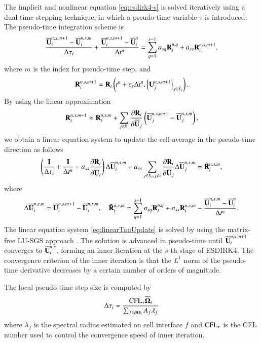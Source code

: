The implicit and nonlinear equation \eqref{eq:esdirk4-s} is solved iteratively using a dual-time stepping technique, in which a pseudo-time variable $\tau$ is introduced. The pseudo-time integration scheme is %
\begin{equation}
    \dfrac{\overline{\mathbf{U}}^{n,s,m+1}_i-\overline{\mathbf{U}}^{n,s,m}_i}{\mathrm\Delta \tau_i} + \dfrac{\overline{\mathbf{U}}^{n,s,m+1}_i - \overline{\mathbf{U}}^{n}_i}{\mathrm\Delta t^n} = \sum_{q=1}^{s-1} a_{sq} \mathbf{R}^{n,q}_i + a_{ss} \mathbf{R}_i^{n,s,m+1},
\end{equation}
where $m$ is the index for pseudo-time step, and
\begin{equation}
    \mathbf{R}^{n,s,m+1}_i  = \mathbf{R}_i \left(t^n + c_s \mathrm\Delta t^n, \left\{\mathbf{U}^{n,s,m+1}_j\right\}_{j \in S_i}\right).
\end{equation}
By using the linear approximation
\begin{equation}
    \mathbf{R}^{n,s,m+1}_i \approx \mathbf{R}^{n,s,m}_i + \sum_{j \in S_i} \dfrac{\partial \mathbf{R}_i}{\partial \overline{\mathbf{U}}_j} \left(\overline{\mathbf{U}}^{n,s,m+1}_j-\overline{\mathbf{U}}^{n,s,m}_j\right),
\end{equation}
we obtain a linear equation system to update the cell-average in the pseudo-time direction as follows
\begin{equation}
    \left(\frac{\eye}{\inc \tau_i} + \frac{\eye}{\inc t^n} -a_{ss}\partialderivative{\R_i }{\uu_i} \right) \inc \uu^{n,s, m}_i
    -
    a_{ss}\sum_{j\in S_i,j\neq i} {
        \partialderivative{\R_i}{\uu_j} \inc \uu^{n,s, m}_j
    }
    = \tilde{\R}^{n,s,m}_i,
    \label{eq:linearTauUpdate}
\end{equation}
where
\begin{equation}
    \label{eq:define-inc}
    \mathrm\Delta \overline{\mathbf{U}}^{n,s,m}_i= \overline{\mathbf{U}}^{n,s,m + 1}_i - \overline{\mathbf{U}}^{n,s,m}_i, \quad \tilde{\mathbf{R}}^{n,s,m}_i= \sum_{q=1}^{s-1} a_{sq} \mathbf{R}^{n,q}_i + a_{ss} \mathbf{R}_i^{n,s,m} - \dfrac{\overline{\mathbf{U}}^{n,s,m}_i - \overline{\mathbf{U}}^{n}_i}{\mathrm\Delta t^n}.
\end{equation}
The linear equation system \eqref{eq:linearTauUpdate} is solved by using the matrix-free LU-SGS approach \cite{luo1998fast}. The solution is advanced in pseudo-time until $\overline{\mathbf{U}}^{n,s,m+1}_{i}$ converges to $\overline{\mathbf{U}}^{n,s}_{i}$, forming an inner iteration at the $s$-th stage of ESDIRK4. The convergence criterion of the inner iteration is that the $L^1$ norm of the pseudo-time derivative decreases by a certain number of orders of magnitude.

The local pseudo-time step size is computed by
\begin{equation}
    \label{eq:local-pseudo-time-step}
    \mathrm\Delta \tau_{i} = \frac{\text{CFL}_\tau \overline{\mathbf{\Omega}}_i }
    {\sum_{f \in \partial \mathbf{\Omega}_i}{A_f}\lambda_{f}}
\end{equation}
where $\lambda_{f}$ is the spectral radius estimated on cell interface $f$ and $\text{CFL}_\tau$ is the CFL number used to control the convergence speed of inner iteration.


